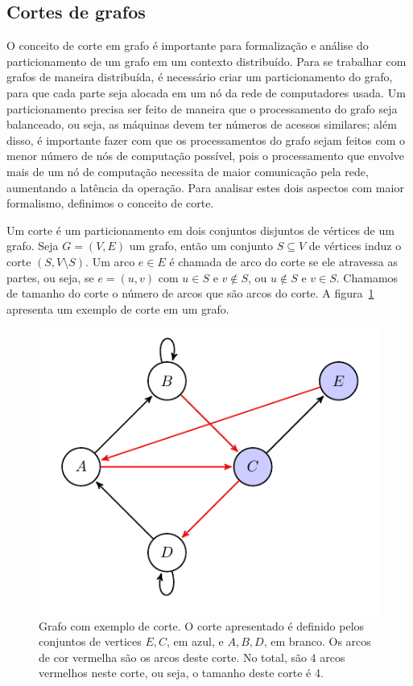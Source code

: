 \documentclass[conference]{IEEEtran}
\begin{document}

\subsection{Cortes de grafos}
O conceito de corte em grafo é importante para formalização e análise
do particionamento de um grafo em um contexto distribuído. Para se
trabalhar com grafos de maneira distribuída, é necessário criar um
particionamento do grafo, para que cada parte seja alocada em um nó da
rede de computadores usada. Um particionamento precisa ser feito de
maneira que o processamento do grafo seja balanceado, ou seja, as
máquinas devem ter números de acessos similares; além disso, é
importante fazer com que os processamentos do grafo sejam feitos com o
menor número de nós de computação possível, pois o processamento que
envolve mais de um nó de computação necessita de maior comunicação pela
rede, aumentando a latência da operação. Para analisar estes dois
aspectos com maior formalismo, definimos o conceito de corte.

Um corte é um particionamento em dois conjuntos disjuntos de vértices de
um grafo. Seja $G = (V, E)$ um grafo, então um conjunto $S \subseteq V$
de vértices induz o corte $(S, V \setminus S)$. Um arco $e \in E$ é
chamada de arco do corte se ele atravessa as partes, ou seja, se
$e = (u, v)$ com $u \in S$ e $v \notin S$, ou $u \notin S$ e $v \in S$.
Chamamos de tamanho do corte o número de arcos que são arcos do corte. A
figura~\ref{fig:example_cut} apresenta um exemplo de corte em um grafo.

\begin{figure}
    \begin{center}
        \includegraphics[width=.5\textwidth]{fund_conc/cut_example.pdf}
    \end{center}
    \caption{Grafo com exemplo de corte. O corte apresentado é definido
    pelos conjuntos de vertices ${E, C}$, em azul, e $A, B, D$, em
    branco. Os arcos de cor vermelha são os arcos deste corte. No total,
    são 4 arcos vermelhos neste corte, ou seja, o tamanho deste corte
    é 4.}
    \label{fig:example_cut}
\end{figure}
\end{document}
